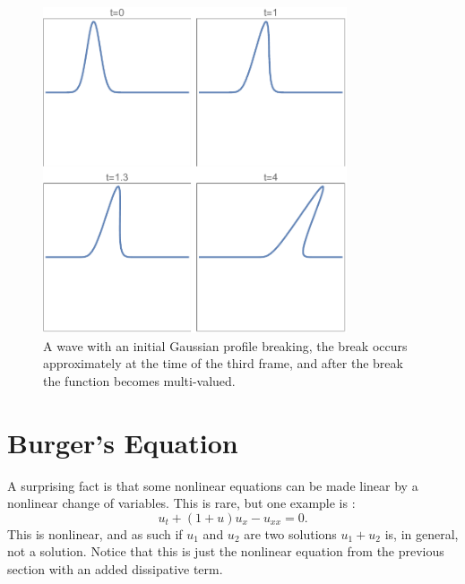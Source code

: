 \documentclass[fleqn]{NotesClass}
\begin{document}
    \begin{figure}
        \includegraphics[width=0.8\textwidth]{images/breaking-wave}
        \caption[breaking wave]{A wave with an initial Gaussian profile breaking, the break occurs approximately at the time of the third frame, and after the break the function becomes multi-valued.}
        \label{fig:breaking wave}
    \end{figure}
    
    \section{Burger's Equation}
    A surprising fact is that some nonlinear equations can be made linear by a nonlinear change of variables.
    This is rare, but one example is :
    \begin{equation}
        u_t + (1 + u)u_x - u_{xx} = 0.
    \end{equation}
    This is nonlinear, and as such if \(u_1\) and \(u_2\) are two solutions \(u_1 + u_2\) is, in general, not a solution.
    Notice that this is just the nonlinear equation from the previous section with an added dissipative term.
    
\end{document}
